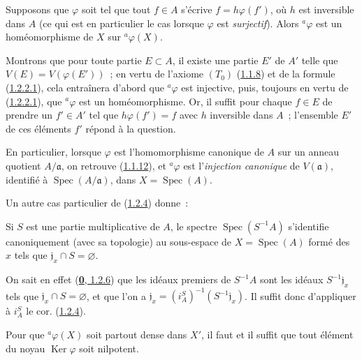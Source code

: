 \begin{corollary}[1.2.4]
\label{I.1.2.4-fr}
Supposons que $\varphi$ soit tel que tout $f\in A$ s'écrive
$f=h\varphi(f')$, où $h$ est inversible dans $A$ \textup{(ce qui est en particulier
le cas lorsque $\varphi$ est \emph{surjectif})}. Alors ${}^a\varphi$ est un
homéomorphisme de $X$ sur ${}^a\varphi(X)$.
\end{corollary}

Montrons que pour toute partie $E\subset A$, il existe une partie $E'$ de
$A'$ telle que $V(E)=V(\varphi(E'))$~; en vertu de l'axiome $(T_0)$
(\hyperref[I.1.1.8-fr]{1.1.8}) et de la formule
(\hyperref[I.1.2.2.1-fr]{1.2.2.1}), cela entraînera d'abord que
${}^a\varphi$ est injective, puis, toujours en vertu de
(\hyperref[I.1.2.2.1-fr]{1.2.2.1}), que ${}^a\varphi$ est un
homéomorphisme. Or, il suffit pour chaque $f\in E$ de prendre un $f'\in A'$ tel
que $h\varphi(f')=f$ avec $h$ inversible dans $A$~; l'ensemble $E'$ de ces
éléments $f'$ répond à la question.

\begin{env}[1.2.5]
\label{I.1.2.5-fr}
En particulier, lorsque $\varphi$ est l'homomorphisme canonique de $A$ sur un
anneau quotient $A/\mathfrak{a}$, on retrouve
(\hyperref[I.1.1.12-fr]{1.1.12}), et ${}^a\varphi$ est l'\emph{injection canonique}
de $V(\mathfrak{a})$, identifié à $\operatorname{Spec}(A/\mathfrak{a})$,
dans $X=\operatorname{Spec}(A)$.
\end{env}

Un autre cas particulier de (\hyperref[I.1.2.4-fr]{1.2.4}) donne~:

\begin{corollary}[1.2.6]
\label{I.1.2.6-fr}
Si $S$ est une partie multiplicative de $A$, le spectre
$\operatorname{Spec}(S^{-1}A)$ s'identifie canoniquement (avec sa topologie)
au sous-espace de $X=\operatorname{Spec}(A)$ formé des $x$ tels que
$\mathfrak{j}_x\cap S=\varnothing$.
\end{corollary}

On sait en effet (\hyperref[0.1.2.6-fr]{\textbf{0}, 1.2.6}) que les idéaux premiers de
$S^{-1}A$ sont les idéaux $S^{-1}\mathfrak{j}_x$ tels que
$\mathfrak{j}_x\cap S=\varnothing$, et que l'on a
$\mathfrak{j}_x=(i_A^S)^{-1}(S^{-1}\mathfrak{j}_x)$. Il suffit donc
d'appliquer à $i_A^S$ le cor. (\hyperref[I.1.2.4-fr]{1.2.4}).

\begin{corollary}[1.2.7]
\label{I.1.2.7-fr}
Pour que ${}^a\varphi(X)$ soit partout dense dans $X'$, il faut et il suffit
que tout élément du noyau $\operatorname{Ker}\varphi$ soit nilpotent.
\end{corollary}

